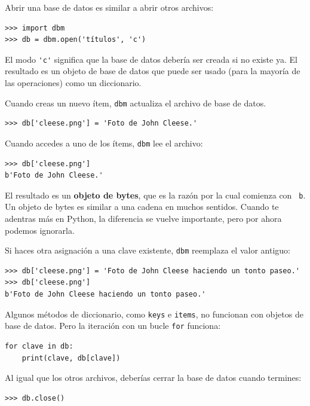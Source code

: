 \documentclass[10pt]{book}
\begin{document}
Abrir una base de datos es similar a abrir otros archivos:

\begin{verbatim}
>>> import dbm
>>> db = dbm.open('títulos', 'c')
\end{verbatim}
%
El modo \verb"'c'" significa que la base de datos debería ser creada si
no existe ya.  El resultado es un objeto de base de datos
que puede ser usado (para la mayoría de las operaciones) como un diccionario.

Cuando creas un nuevo ítem, {\tt dbm} actualiza el archivo de base de datos.

\begin{verbatim}
>>> db['cleese.png'] = 'Foto de John Cleese.'
\end{verbatim}
%
Cuando accedes a uno de los ítems, {\tt dbm} lee el archivo:

\begin{verbatim}
>>> db['cleese.png']
b'Foto de John Cleese.'
\end{verbatim}
%
El resultado es un {\bf objeto de bytes}, que es la razón por la cual comienza con {\tt
  b}.  Un objeto de bytes es similar a una cadena en muchos sentidos.  Cuando
te adentras más en Python, la diferencia se vuelve importante, pero por ahora
podemos ignorarla.

Si haces otra asignación a una clave existente, {\tt dbm} reemplaza
el valor antiguo:

\begin{verbatim}
>>> db['cleese.png'] = 'Foto de John Cleese haciendo un tonto paseo.'
>>> db['cleese.png']
b'Foto de John Cleese haciendo un tonto paseo.'
\end{verbatim}
%

Algunos métodos de diccionario, como {\tt keys} e {\tt items}, no
funcionan con objetos de base de datos.  Pero la iteración con un bucle {\tt for}
funciona:

\begin{verbatim}
for clave in db:
    print(clave, db[clave])
\end{verbatim}
%
Al igual que los otros archivos, deberías cerrar la base de datos cuando
termines:

\begin{verbatim}
>>> db.close()
\end{verbatim}
%
\end{document}
